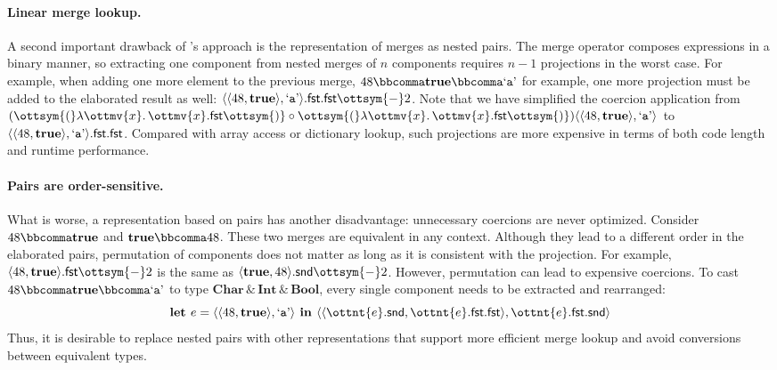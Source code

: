 \paragraph{Linear merge lookup.}
A second important drawback of \citeauthor{dunfield2014elaborating}'s approach
is the representation of merges as nested pairs. The merge operator composes
expressions in a binary manner, so extracting one component from nested merges
of $n$ components requires $n-1$ projections in the worst case. For example,
when adding one more element to the previous merge, $48  \bbcomma   \mathbf{true}   \bbcomma   \text{`\texttt{a}'} $ for
example, one more projection must be added to the elaborated result as well:
$   \langle   \langle  48 ,   \mathbf{true}   \rangle  ,   \text{`\texttt{a}'}   \rangle   . \mathsf{fst}   . \mathsf{fst}   \ottsym{-}  2$. Note that we have simplified the coercion
application from $(\ottsym{(}    \lambda \ottmv{x} .\, \ottmv{x}   . \mathsf{fst}   \ottsym{)}\circ\ottsym{(}    \lambda \ottmv{x} .\, \ottmv{x}   . \mathsf{fst}   \ottsym{)}) \langle   \langle  48 ,   \mathbf{true}   \rangle  ,   \text{`\texttt{a}'}   \rangle $ to
$   \langle   \langle  48 ,   \mathbf{true}   \rangle  ,   \text{`\texttt{a}'}   \rangle   . \mathsf{fst}   . \mathsf{fst} $. Compared with array access or dictionary lookup,
such projections are more expensive in terms of both code length and runtime
performance.

\paragraph{Pairs are order-sensitive.}
What is worse, a representation based on pairs has another disadvantage:
unnecessary coercions are never optimized. Consider $48  \bbcomma   \mathbf{true} $ and
$ \mathbf{true}   \bbcomma  48$. These two merges are equivalent in any context. Although they
lead to a different order in the elaborated pairs, permutation of components
does not matter as long as it is consistent with the projection. For example,
$  \langle  48 ,   \mathbf{true}   \rangle   . \mathsf{fst}   \ottsym{-}  2$ is the same as $  \langle   \mathbf{true}  ,  48  \rangle   . \mathsf{snd}   \ottsym{-}  2$. However, permutation
can lead to expensive coercions. To cast $48  \bbcomma   \mathbf{true}   \bbcomma   \text{`\texttt{a}'} $ to type
$ \mathbf{Char}   \, {\&} \,   \mathbf{Int}   \, {\&} \,   \mathbf{Bool} $, every single component needs to be extracted and
rearranged:
\[
\textbf{let } e =  \langle   \langle  48 ,   \mathbf{true}   \rangle  ,   \text{`\texttt{a}'}   \rangle  \textbf{ in }
 \langle   \langle   \ottnt{e}  . \mathsf{snd}  ,    \ottnt{e}  . \mathsf{fst}   . \mathsf{fst}   \rangle  ,    \ottnt{e}  . \mathsf{fst}   . \mathsf{snd}   \rangle 
\]
Thus, it is desirable to replace nested pairs with other representations that
support more efficient merge lookup and avoid conversions between equivalent
types.


